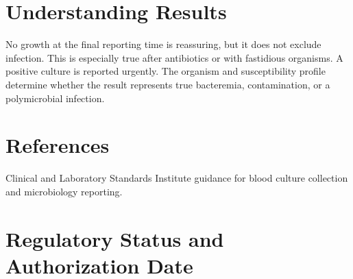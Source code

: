 \section*{Understanding Results}
No growth at the final reporting time is reassuring, but it does not exclude infection. This is especially true after antibiotics or with fastidious organisms. A positive culture is reported urgently. The organism and susceptibility profile determine whether the result represents true bacteremia, contamination, or a polymicrobial infection.

\section*{References}
Clinical and Laboratory Standards Institute guidance for blood culture collection and microbiology reporting.

\clearpage


\section*{Regulatory Status and Authorization Date}

\clearpage
